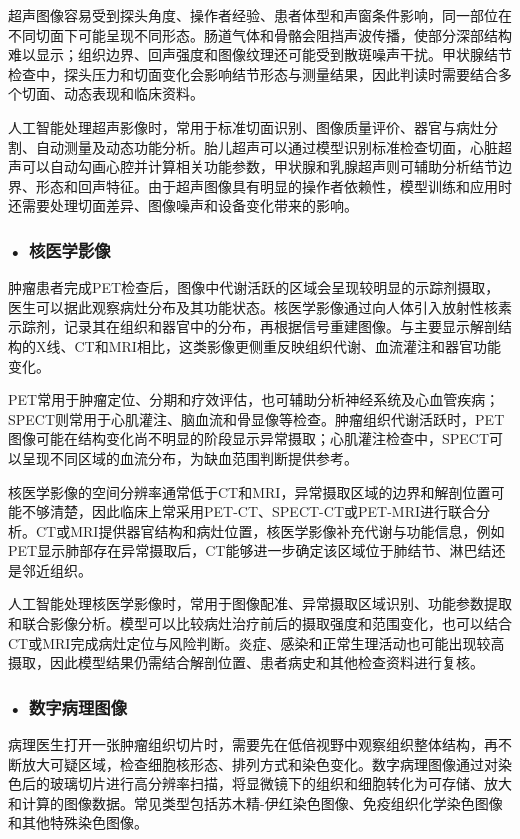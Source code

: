 超声图像容易受到探头角度、操作者经验、患者体型和声窗条件影响，同一部位在不同切面下可能呈现不同形态。肠道气体和骨骼会阻挡声波传播，使部分深部结构难以显示；组织边界、回声强度和图像纹理还可能受到散斑噪声干扰。甲状腺结节检查中，探头压力和切面变化会影响结节形态与测量结果，因此判读时需要结合多个切面、动态表现和临床资料。

人工智能处理超声影像时，常用于标准切面识别、图像质量评价、器官与病灶分割、自动测量及动态功能分析。胎儿超声可以通过模型识别标准检查切面，心脏超声可以自动勾画心腔并计算相关功能参数，甲状腺和乳腺超声则可辅助分析结节边界、形态和回声特征。由于超声图像具有明显的操作者依赖性，模型训练和应用时还需要处理切面差异、图像噪声和设备变化带来的影响。

\subsubsection*{\textbf{• 核医学影像}}

肿瘤患者完成PET检查后，图像中代谢活跃的区域会呈现较明显的示踪剂摄取，医生可以据此观察病灶分布及其功能状态。核医学影像通过向人体引入放射性核素示踪剂，记录其在组织和器官中的分布，再根据信号重建图像。与主要显示解剖结构的X线、CT和MRI相比，这类影像更侧重反映组织代谢、血流灌注和器官功能变化。

PET常用于肿瘤定位、分期和疗效评估，也可辅助分析神经系统及心血管疾病；SPECT则常用于心肌灌注、脑血流和骨显像等检查。肿瘤组织代谢活跃时，PET图像可能在结构变化尚不明显的阶段显示异常摄取；心肌灌注检查中，SPECT可以呈现不同区域的血流分布，为缺血范围判断提供参考。

核医学影像的空间分辨率通常低于CT和MRI，异常摄取区域的边界和解剖位置可能不够清楚，因此临床上常采用PET-CT、SPECT-CT或PET-MRI进行联合分析。CT或MRI提供器官结构和病灶位置，核医学影像补充代谢与功能信息，例如PET显示肺部存在异常摄取后，CT能够进一步确定该区域位于肺结节、淋巴结还是邻近组织。

人工智能处理核医学影像时，常用于图像配准、异常摄取区域识别、功能参数提取和联合影像分析。模型可以比较病灶治疗前后的摄取强度和范围变化，也可以结合CT或MRI完成病灶定位与风险判断。炎症、感染和正常生理活动也可能出现较高摄取，因此模型结果仍需结合解剖位置、患者病史和其他检查资料进行复核。


\subsubsection*{\textbf{• 数字病理图像}}

病理医生打开一张肿瘤组织切片时，需要先在低倍视野中观察组织整体结构，再不断放大可疑区域，检查细胞核形态、排列方式和染色变化。数字病理图像通过对染色后的玻璃切片进行高分辨率扫描，将显微镜下的组织和细胞转化为可存储、放大和计算的图像数据。常见类型包括苏木精-伊红染色图像、免疫组织化学染色图像和其他特殊染色图像。

